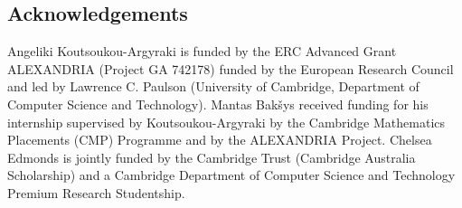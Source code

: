 \documentclass[11pt,a4paper]{article}
\begin{document}
\subsection*{Acknowledgements}
Angeliki Koutsoukou-Argyraki is funded by the ERC Advanced Grant ALEXANDRIA (Project GA
742178) funded by the European Research Council and led by Lawrence C. Paulson 
(University of Cambridge, Department of Computer Science and Technology). 
Mantas Bak\v{s}ys received funding for his internship supervised by Koutsoukou-Argyraki by the 
Cambridge Mathematics Placements (CMP) Programme and by the ALEXANDRIA Project. 
Chelsea Edmonds is jointly funded by the Cambridge Trust 
(Cambridge Australia Scholarship) and a Cambridge Department of Computer Science and Technology Premium Research
Studentship. 
\newpage






\end{document}
